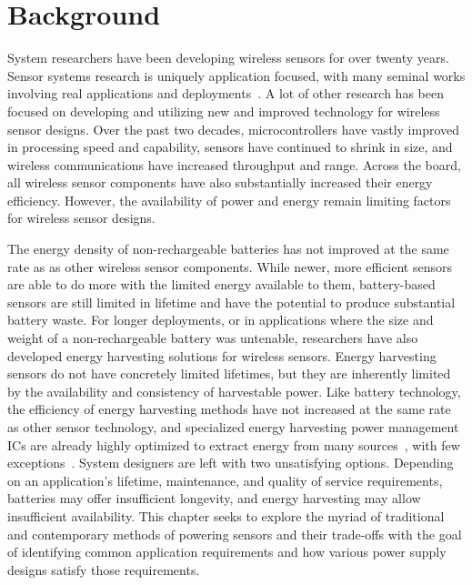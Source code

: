 \chapter{Background}
\label{chap:background}
System researchers have been developing wireless sensors for over twenty years.
Sensor systems research is uniquely application focused, with many seminal works involving real applications and deployments~\cite{juang2002energy,mainwaring2002wireless,tolle2005macroscope}.
A lot of other research has been focused on developing and utilizing new and improved technology for wireless sensor designs.
Over the past two decades, microcontrollers have vastly improved in processing speed and capability, sensors have continued to shrink in size, and wireless communications have increased throughput and range.
Across the board, all wireless sensor components have also substantially increased their energy efficiency.
However, the availability of power and energy remain limiting factors for wireless sensor designs.

The energy density of non-rechargeable batteries has not improved at the same rate as as other wireless sensor components.
While newer, more efficient sensors are able to do more with the limited energy available to them, battery-based sensors are still limited in lifetime and have the potential to produce substantial battery waste.
For longer deployments, or in applications where the size and weight of a non-rechargeable battery was untenable, researchers have also developed energy harvesting solutions for wireless sensors.
Energy harvesting sensors do not have concretely limited lifetimes, but they are inherently limited by the availability and consistency of harvestable power.
Like battery technology, the efficiency of energy harvesting methods have not increased at the same rate as other sensor technology, and specialized energy harvesting power management ICs are already highly optimized to extract energy from many sources~\cite{adp5091,bq25505,matrix_prometheus}, with few exceptions~\cite{josephson2020farming,marcano2022soil}.
System designers are left with two unsatisfying options.
Depending on an application's lifetime, maintenance, and quality of service requirements, batteries may offer insufficient longevity, and energy harvesting may allow insufficient availability.
This chapter seeks to explore the myriad of traditional and contemporary methods of powering sensors and their trade-offs
with the goal of identifying common application requirements and how various power supply designs satisfy those requirements.

